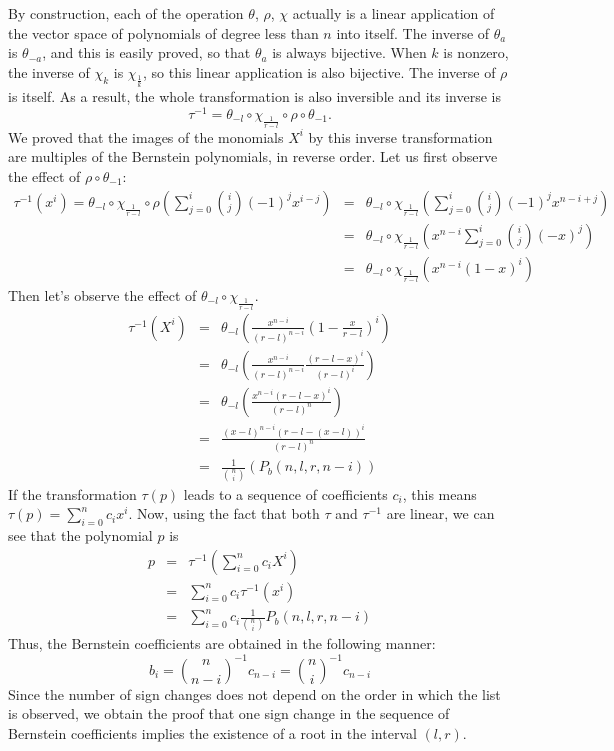 \documentclass{mscs}
\begin{document}
By construction, each of the operation \(\theta\), \(\rho\), \(\chi\)
actually is a linear application
of the vector space of polynomials of degree less than \(n\) into itself.
The inverse of \(\theta_a\) is \(\theta_{-a}\), and this is easily proved,
so that \(\theta_a\) is always bijective.  When \(k\) is nonzero,
the inverse of \(\chi_k\) is \(\chi_{\frac{1}{k}}\), so this linear
application is also bijective.  The inverse of \(\rho\) is itself.
As a result, the whole transformation is also inversible and its inverse
is \[\tau^{-1}=\theta_{-l}\circ\chi_{\frac{1}{r-l}} \circ \rho \circ \theta_{-1}.\]
We proved that the images of the monomials \(X^i\) by this inverse
transformation are multiples of the Bernstein polynomials, in reverse order.
Let us first observe the effect of \(\rho\circ \theta_{-1}\):
\begin{eqnarray*}
\tau^{-1}(x^i)=
\theta_{-l}\circ\chi_{\frac{1}{r-l}} \circ \rho\left(\sum_{j=0}^i\binom{i}{j}(-1)^jx^{i-j}\right)
&=&
\theta_{-l}\circ\chi_{\frac{1}{r-l}}\left( \sum_{j=0}^i\binom{i}{j}(-1)^j x^{n-i+j}
\right)\\
&=&\theta_{-l}\circ\chi_{\frac{1}{r-l}}\left(x^{n-i}\sum_{j=0}^i\binom{i}{j} (-x)^j\right)\\
&=&\theta_{-l}\circ\chi_{\frac{1}{r-l}}\left(x^{n-i}(1-x)^i\right)
\end{eqnarray*}
Then let's observe the effect of \(\theta_{-l}\circ\chi_{\frac{1}{r-l}}\).
\begin{eqnarray*}
\tau^{-1}(X^i)
&=&\theta_{-l}\left(\frac{x^{n-i}}{(r-l)^{n-i}}\left(1-\frac{x}{r-l}\right)^i\right)\\
&=&\theta_{-l}\left(\frac{x^{n-i}}{(r-l)^{n-i}}\frac{(r-l-x)^i}{(r-l)^i}\right)
\\
&=&\theta_{-l}\left(\frac{x^{n-i}(r-l-x)^i}{(r-l)^n}\right)\\
&=&\frac{(x-l)^{n-i}(r-l-(x-l))^i}{(r-l)^n}\\
&=&\frac{1}{\binom{n}{i}}(P_b(n,l,r,n-i))
\end{eqnarray*}
If the transformation \(\tau(p)\) leads to a sequence
of coefficients \(c_i\), this means \(\tau(p)=\sum_{i=0}^{n} c_i x^i\).  Now,
using the fact that both \(\tau\) and \(\tau^{-1}\) are linear, we can see
that the polynomial \(p\) is
\begin{eqnarray*}
p&=&\tau^{-1}\left(\sum_{i=0}^{n} c_i X^i\right)\\
&=&\sum_{i=0}^{n}c_i\tau^{-1}(x^i)\\
&=&\sum_{i=0}^{n}c_i\frac{1}{\binom{n}{i}} P_b(n,l,r,n-i)
\end{eqnarray*}
Thus, the Bernstein coefficients are obtained in the following manner:
\[b_i=\binom{n}{n-i}^{-1}c_{n-i} = \binom{n}{i}^{-1}c_{n-i}\]
Since the number of sign changes does not depend on the order
in which the list is observed, we obtain the proof that one sign
change in the sequence of Bernstein coefficients implies the existence
of a root in the interval \((l,r)\).
\end{document}
